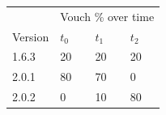 \documentclass[]{article}
\makeatletter
\DeclareRobustCommand{\_}{%
  \leavevmode\vbox{%
    \hrule\@width.5em
          \@height-.26ex
          \@depth\dimexpr.26ex+.28pt\relax}}
\makeatother
\begin{document}
\begin{longtable}[]{@{}llll@{}}
\toprule
  & \multicolumn{3}{c}{Vouch \% over time} \tabularnewline\cmidrule{2-4}
\begin{minipage}[t]{0.1\columnwidth}\centering\strut
{Version}\strut
\end{minipage} & \begin{minipage}[t]{0.1\columnwidth}\centering\strut
{$t_0$}\strut
\end{minipage} & \begin{minipage}[t]{0.1\columnwidth}\centering\strut
{$t_1$}\strut
\end{minipage} & \begin{minipage}[t]{0.1\columnwidth}\centering\strut
{$t_2$}\strut
\end{minipage}\tabularnewline \midrule
\begin{minipage}[t]{0.1\columnwidth}\centering\strut
{1.6.3}\strut
\end{minipage} & \begin{minipage}[t]{0.1\columnwidth}\centering\strut
{20}\strut
\end{minipage} & \begin{minipage}[t]{0.1\columnwidth}\centering\strut
{20}\strut
\end{minipage} & \begin{minipage}[t]{0.1\columnwidth}\centering\strut
{20}\strut
\end{minipage}\tabularnewline
\begin{minipage}[t]{0.1\columnwidth}\centering\strut
{2.0.1}\strut
\end{minipage} & \begin{minipage}[t]{0.1\columnwidth}\centering\strut
{80}\strut
\end{minipage} & \begin{minipage}[t]{0.1\columnwidth}\centering\strut
{70}\strut
\end{minipage} & \begin{minipage}[t]{0.1\columnwidth}\centering\strut
{0}\strut
\end{minipage}\tabularnewline
\begin{minipage}[t]{0.1\columnwidth}\centering\strut
{2.0.2}\strut
\end{minipage} & \begin{minipage}[t]{0.1\columnwidth}\centering\strut
{0}\strut
\end{minipage} & \begin{minipage}[t]{0.1\columnwidth}\centering\strut
{10}\strut
\end{minipage} & \begin{minipage}[t]{0.1\columnwidth}\centering\strut
{80}\strut
\end{minipage}\tabularnewline
\bottomrule
\end{longtable}
\end{document}
